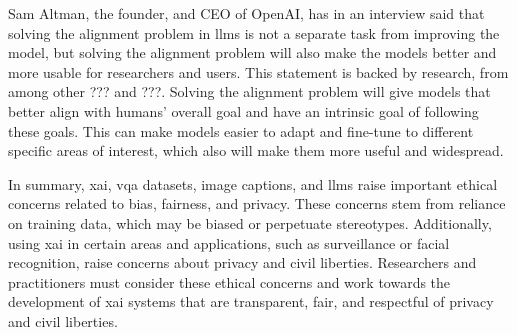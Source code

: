 

Sam Altman, the founder, and CEO of OpenAI, has in an interview said that solving the alignment problem in \glspl{llm} is not a separate task from improving the model, but solving the alignment problem will also make the models better and more usable for researchers and users. This statement is backed by research, from among other ??? and ???. Solving the alignment problem will give models that better align with humans' overall goal and have an intrinsic goal of following these goals. This can make models easier to adapt and fine-tune to different specific areas of interest, which also will make them more useful and widespread. 










\begin{comment}
    Tell how this thesis uses the ethical information above when doing research.
\end{comment}

In summary, \gls{xai}, \gls{vqa} datasets, image captions, and \glspl{llm} raise important ethical concerns related to bias, fairness, and privacy. These concerns stem from reliance on training data, which may be biased or perpetuate stereotypes. Additionally, using \gls{xai} in certain areas and applications, such as surveillance or facial recognition, raise concerns about privacy and civil liberties. Researchers and practitioners must consider these ethical concerns and work towards the development of \gls{xai} systems that are transparent, fair, and respectful of privacy and civil liberties.